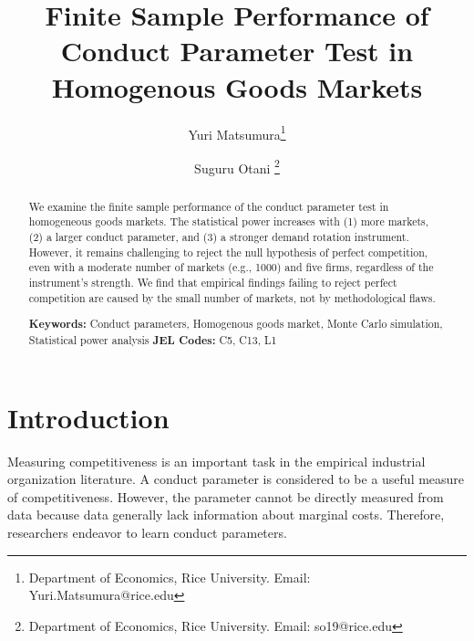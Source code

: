 \documentclass[11pt, a4paper]{article}
\title{Finite Sample Performance of Conduct Parameter Test in Homogenous Goods Markets}
\author{Yuri Matsumura\thanks{Department of Economics, Rice University. Email: Yuri.Matsumura@rice.edu} \and Suguru Otani \thanks{Department of Economics, Rice University. Email: so19@rice.edu
}}
\begin{document}
\maketitle
\begin{abstract}
    We examine the finite sample performance of the conduct parameter test in homogeneous goods markets. The statistical power increases with (1) more markets, (2) a larger conduct parameter, and (3) a stronger demand rotation instrument. However, it remains challenging to reject the null hypothesis of perfect competition, even with a moderate number of markets (e.g., 1000) and five firms, regardless of the instrument's strength. We find that empirical findings failing to reject perfect competition are caused by the small number of markets, not by methodological flaws.
\vspace{0.1in}

\noindent\textbf{Keywords:} Conduct parameters, Homogenous goods market, Monte Carlo simulation, Statistical power analysis
\vspace{0in}
\newline
\noindent\textbf{JEL Codes:} C5, C13, L1

\bigskip
\end{abstract}


\section{Introduction}
Measuring competitiveness is an important task in the empirical industrial organization literature.
A conduct parameter is considered to be a useful measure of competitiveness. 
However, the parameter cannot be directly measured from data because data generally lack information about marginal costs.
Therefore, researchers endeavor to learn conduct parameters.
\end{document}
